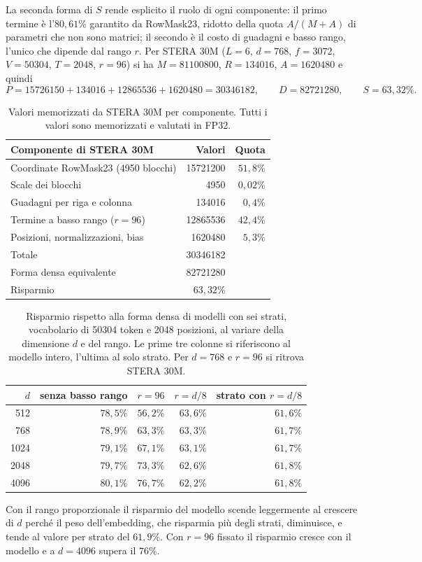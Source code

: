 La seconda forma di $S$ rende esplicito il ruolo di ogni componente: il primo termine è l'$80{,}61\%$ garantito da RowMask23, ridotto della quota $A/(M+A)$ di parametri che non sono matrici; il secondo è il costo di guadagni e basso rango, l'unico che dipende dal rango $r$. Per STERA 30M ($L=6$, $d=768$, $f=3072$, $V=\num{50304}$, $T=\num{2048}$, $r=96$) si ha $M=\num{81100800}$, $R=\num{134016}$, $A=\num{1620480}$ e quindi
\[
P = \num{15726150} + \num{134016} + \num{12865536} + \num{1620480} = \num{30346182},
\qquad D = \num{82721280},
\qquad S = 63{,}32\%.
\]

\begin{table}[htbp]
\centering
\small
\begin{tabular}{lrr}
\toprule
Componente di STERA 30M & Valori & Quota \\
\midrule
Coordinate RowMask23 (\num{4950} blocchi) & \num{15721200} & $51{,}8\%$ \\
Scale dei blocchi & \num{4950} & $0{,}02\%$ \\
Guadagni per riga e colonna & \num{134016} & $0{,}4\%$ \\
Termine a basso rango ($r=96$) & \num{12865536} & $42{,}4\%$ \\
Posizioni, normalizzazioni, bias & \num{1620480} & $5{,}3\%$ \\
\midrule
Totale & \num{30346182} & \\
Forma densa equivalente & \num{82721280} & \\
Risparmio & $63{,}32\%$ & \\
\bottomrule
\end{tabular}
\caption{Valori memorizzati da STERA 30M per componente. Tutti i valori sono memorizzati e valutati in FP32.}
\label{tab:componenti-stera30m}
\end{table}

\begin{table}[htbp]
\centering
\small
\begin{tabular}{rrrrr}
\toprule
$d$ & senza basso rango & $r=96$ & $r=d/8$ & strato con $r=d/8$ \\
\midrule
512 & $78{,}5\%$ & $56{,}2\%$ & $63{,}6\%$ & $61{,}6\%$ \\
768 & $78{,}9\%$ & $63{,}3\%$ & $63{,}3\%$ & $61{,}7\%$ \\
1024 & $79{,}1\%$ & $67{,}1\%$ & $63{,}1\%$ & $61{,}7\%$ \\
2048 & $79{,}7\%$ & $73{,}3\%$ & $62{,}6\%$ & $61{,}8\%$ \\
4096 & $80{,}1\%$ & $76{,}7\%$ & $62{,}2\%$ & $61{,}8\%$ \\
\bottomrule
\end{tabular}
\caption{Risparmio rispetto alla forma densa di modelli con sei strati, vocabolario di \num{50304} token e \num{2048} posizioni, al variare della dimensione $d$ e del rango. Le prime tre colonne si riferiscono al modello intero, l'ultima al solo strato. Per $d=768$ e $r=96$ si ritrova STERA 30M.}
\label{tab:risparmio-crescita}
\end{table}

Con il rango proporzionale il risparmio del modello scende leggermente al crescere di $d$ perché il peso dell'embedding, che risparmia più degli strati, diminuisce, e tende al valore per strato del $61{,}9\%$. Con $r=96$ fissato il risparmio cresce con il modello e a $d=4096$ supera il $76\%$.
